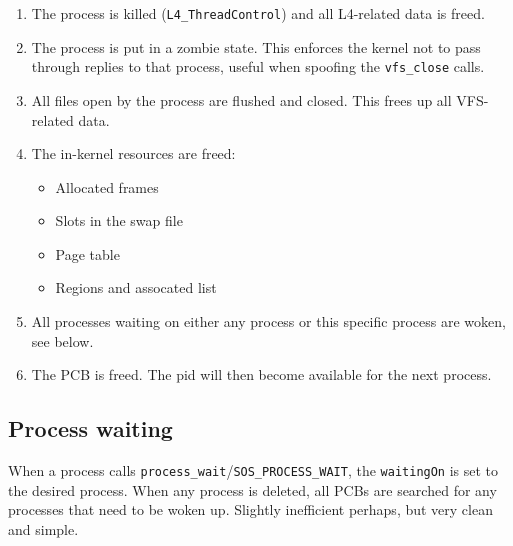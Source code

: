 \documentclass[12pt,english]{article}
\begin{document}
\begin{enumerate}
\item The process is killed (\texttt{L4\_ThreadControl}) and all L4-related data is freed.
\item The process is put in a zombie state.  This enforces the kernel not to pass through replies to that process, useful when spoofing the \texttt{vfs\_close} calls.
\item All files open by the process are flushed and closed.  This frees up all VFS-related data.
\item The in-kernel resources are freed:
\begin{itemize}
\item Allocated frames
\item Slots in the swap file
\item Page table
\item Regions and assocated list
\end{itemize}
\item All processes waiting on either any process or this specific process are woken, see below.  
\item The PCB is freed.  The pid will then become available for the next process.
\end{enumerate}

\subsection{Process waiting}

When a process calls \texttt{process\_wait}/\texttt{SOS\_PROCESS\_WAIT}, the \texttt{waitingOn} is set to the desired process.  When any process is deleted, all PCBs are searched for any processes that need to be woken up.  Slightly inefficient perhaps, but very clean and simple.
\end{document}
